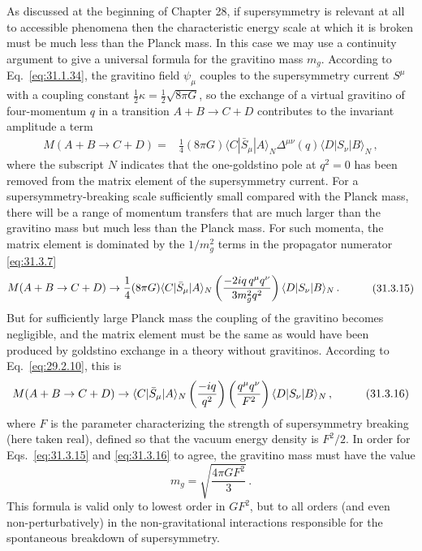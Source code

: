 As discussed at the beginning of Chapter 28, if supersymmetry is relevant
at all to accessible phenomena then the characteristic energy scale at
which it is broken must be much less than the Planck mass. In this case we
may use a continuity argument to give a universal formula for the
gravitino mass \(m_g\). According to Eq.~\eqref{eq:31.1.34}, the gravitino
field \(\psi_\mu\) couples to the supersymmetry current \(S^\mu\) with a
coupling constant \(\frac12\kappa=\frac12\sqrt{8\pi G}\), so the exchange
of a virtual gravitino of four-momentum \(q\) in a transition
\(A+B\to C+D\) contributes to the invariant amplitude a term
\begin{equation}
  \begin{aligned}
  M(A+B\to C+D)
  ={}&\frac14(8\pi G)
  \langle C|\bar S_\mu|A\rangle_N
  \Delta^{\mu\nu}(q)
  \langle D|S_\nu|B\rangle_N\,,
  \end{aligned}
  \tag{31.3.14}\label{eq:31.3.14}
\end{equation}
where the subscript \(N\) indicates that the one-goldstino pole at
\(q^2=0\) has been removed from the matrix element of the supersymmetry
current. For a supersymmetry-breaking scale sufficiently small compared
with the Planck mass, there will be a range of momentum transfers that are
much larger than the gravitino mass but much less than the Planck mass.
For such momenta, the matrix element is dominated by the \(1/m_g^2\)
terms in the propagator numerator \eqref{eq:31.3.7}
\begin{equation}
  \begin{aligned}
  M(A+B\to C+D)\to{}&
  \frac14(8\pi G)
  \langle C|\bar S_\mu|A\rangle_N
  \left(\frac{-2i\sl{q}\,q^\mu q^\nu}{3m_g^2q^2}\right)
  \langle D|S_\nu|B\rangle_N\,.
  \end{aligned}
  \tag{31.3.15}\label{eq:31.3.15}
\end{equation}
But for sufficiently large Planck mass the coupling of the gravitino
becomes negligible, and the matrix element must be the same as would have
been produced by goldstino exchange in a theory without gravitinos.
According to Eq.~\eqref{eq:29.2.10}, this is
\begin{equation}
  \begin{aligned}
  M(A+B\to C+D)\to{}&
  \langle C|\bar S_\mu|A\rangle_N
  \left(\frac{-i\sl{q}}{q^2}\right)
  \left(\frac{q^\mu q^\nu}{F^2}\right)
  \langle D|S_\nu|B\rangle_N\,,
  \end{aligned}
  \tag{31.3.16}\label{eq:31.3.16}
\end{equation}
where \(F\) is the parameter characterizing the strength of supersymmetry
breaking (here taken real), defined so that the vacuum energy density is
\(F^2/2\). In order for Eqs.~\eqref{eq:31.3.15} and
\eqref{eq:31.3.16} to agree, the gravitino mass must have the value
\begin{equation}
  m_g=\sqrt{\frac{4\pi G F^2}{3}}\,.
  \tag{31.3.17}\label{eq:31.3.17}
\end{equation}
This formula is valid only to lowest order in \(GF^2\), but to all orders
(and even non-perturbatively) in the non-gravitational interactions
responsible for the spontaneous breakdown of supersymmetry.

